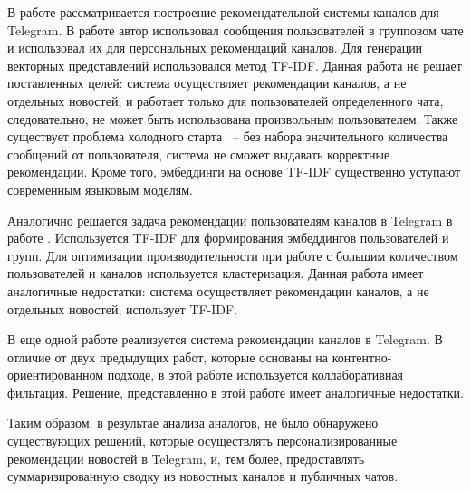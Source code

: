 В работе \cite{tg_rs_1} рассматривается построение рекомендательной системы каналов для Telegram. В работе автор использовал сообщения пользователей в групповом чате и использовал их для персональных рекомендаций каналов. Для генерации векторных представлений использовался метод TF-IDF. Данная работа не решает поставленных целей: система осуществляет рекомендации каналов, а не отдельных новостей, и работает только для пользователей определенного чата, следовательно, не может быть использована произвольным пользователем. Также существует проблема холодного старта ~-- без набора значительного количества сообщений от пользователя, система не сможет выдавать корректные рекомендации. Кроме того, эмбеддинги на основе TF-IDF существенно уступают современным языковым моделям.

Аналогично решается задача рекомендации пользователям каналов в Telegram в работе \cite{tg_rs_2}. Используется TF-IDF для формирования эмбеддингов пользователей и групп. Для оптимизации производительности при работе с большим количеством пользователей и каналов используется кластеризация. Данная работа имеет аналогичные недостатки: система осуществляет рекомендации каналов, а не отдельных новостей, использует TF-IDF.

В еще одной работе \cite{tg_rs_3} реализуется система рекомендации каналов в Telegram. В отличие от двух предыдущих работ, которые основаны на контентно-ориентированном подходе, в этой работе используется коллаборативная фильтация. Решение, представленно в этой работе имеет аналогичные недостатки.

Таким образом, в результае анализа аналогов, не было обнаружено существующих решений, которые осуществлять персонализированные рекомендации новостей в Telegram, и, тем более, предоставлять суммаризированную сводку из новостных каналов и публичных чатов.
